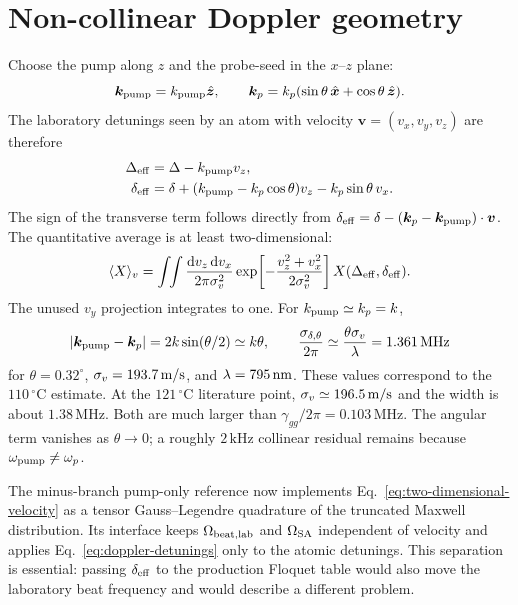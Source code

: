 \documentclass[11pt,a4paper]{article}
\newcommand{\dd}{\mathrm d}
\newcommand{\MHz}{\,\mathrm{MHz}}
\newcommand{\kHz}{\,\mathrm{kHz}}
\newcommand{\degC}{\,^{\circ}\mathrm C}
\begin{document}
\section{Non-collinear Doppler geometry}
\label{sec:doppler}

Choose the pump along $z$ and the probe-seed in the $x$--$z$ plane:
\[
\bm k_{\rm pump}=k_{\rm pump}\hat{\bm z},\qquad
\bm k_p=k_p(\sin\theta\,\hat{\bm x}+\cos\theta\,\hat{\bm z}).
\]
The laboratory detunings seen by an atom with velocity
$\bm v=(v_x,v_y,v_z)$ are therefore
\begin{align}
\Delta_{\rm eff}&=\Delta-k_{\rm pump}v_z,\\
\delta_{\rm eff}&=\delta+(k_{\rm pump}-k_p\cos\theta)v_z
-k_p\sin\theta\,v_x .
\label{eq:doppler-detunings}
\end{align}
The sign of the transverse term follows directly from
$\delta_{\rm eff}=\delta-(\bm k_p-\bm k_{\rm pump})\cdot\bm v$.
The quantitative average is at least two-dimensional:
\begin{equation}
\langle X\rangle_v=
\int\!\!\int\frac{\dd v_z\,\dd v_x}{2\pi\sigma_v^2}
\exp\!\left[-\frac{v_z^2+v_x^2}{2\sigma_v^2}\right]
X(\Delta_{\rm eff},\delta_{\rm eff}).
\label{eq:two-dimensional-velocity}
\end{equation}
The unused $v_y$ projection integrates to one. For
$k_{\rm pump}\simeq k_p=k$,
\begin{equation}
|\bm k_{\rm pump}-\bm k_p|=2k\sin(\theta/2)\simeq k\theta,\qquad
\frac{\sigma_{\delta,\theta}}{2\pi}
\simeq\frac{\theta\sigma_v}{\lambda}=1.361\MHz
\label{eq:angular-doppler}
\end{equation}
for $\theta=0.32^\circ$, $\sigma_v=193.7\,{\rm m/s}$, and
$\lambda=795\,{\rm nm}$. These values correspond to the $110\degC$ estimate. At the
$121\degC$ literature point, $\sigma_v\simeq196.5\,{\rm m/s}$ and the width is
about $1.38\MHz$. Both are much larger than
$\gamma_{gg}/2\pi=0.103\MHz$. The angular term vanishes as
$\theta\to0$; a roughly $2\kHz$ collinear residual remains because
$\omega_{\rm pump}\ne\omega_p$.

The minus-branch pump-only reference now implements
Eq.~\eqref{eq:two-dimensional-velocity} as a tensor Gauss--Legendre quadrature
of the truncated Maxwell distribution. Its interface keeps
$\Omega_{\rm beat,lab}$ and $\Omega_{\rm SA}$ independent of velocity and
applies Eq.~\eqref{eq:doppler-detunings} only to the atomic detunings. This
separation is essential: passing $\delta_{\rm eff}$ to the production Floquet
table would also move the laboratory beat frequency and would describe a
different problem.
\end{document}
